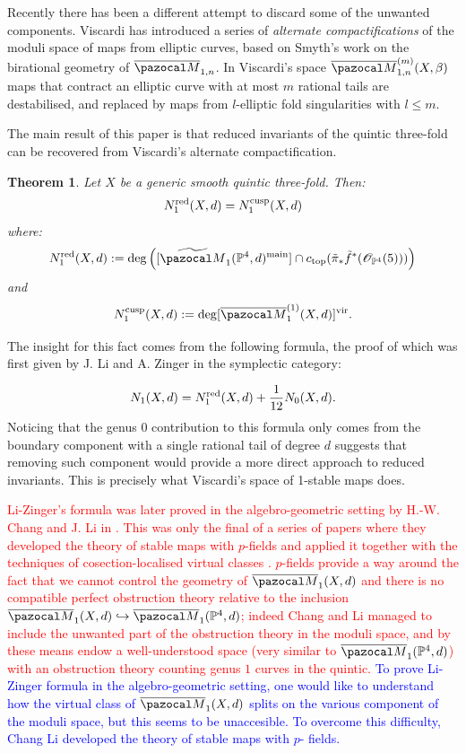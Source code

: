 \documentclass[11pt]{amsart}
\newcommand{\Mone}[3]{\overline{\pazocal M}^{(1)}_{#1}(#2,#3)}
\newcommand{\PP}{\mathbb P}
\newcommand{\oM}{\overline{\pazocal M}}
\theoremstyle{plain}
\newtheorem{thm}{Theorem}[section]
\theoremstyle{definition}
\begin{document}
Recently there has been a different attempt to discard some of the unwanted components. Viscardi \cite{VISC} has introduced a series of \emph{alternate compactifications} of the moduli space of maps from elliptic curves, based on Smyth's work on the birational geometry of $\oM_{1,n}$. In Viscardi's space $\oM_{1,n}^{(m)}(X,\beta)$ maps that contract an elliptic curve with at most $m$ rational tails are destabilised, and replaced by maps from $l$-elliptic fold singularities with $l\leq m$.

The main result of this paper is that reduced invariants of the quintic three-fold can be recovered from Viscardi's alternate compactification.

\begin{thm}
Let $X$ be a generic smooth quintic three-fold. Then:
\[
N_1^{\rm{red}}(X,d)=N_1^{\rm{cusp}}(X,d)
\]
where:
\[N_1^{\rm{red}}(X,d):=\deg \left([\widetilde{\pazocal M}_{1}(\PP^4,d)^{\rm{main}}]\cap c_{\rm{top}}(\tilde\pi_*\tilde f^*(\mathcal O_{\PP^4}(5)))\right)\]
and
\[N_1^{\rm{cusp}}(X,d):=\deg [\Mone{1}{X}{d}]^{\rm{vir}}.
\]
\end{thm}

The insight for this fact comes from the following formula, the proof of which was first given by J. Li and A. Zinger \cite{LZ} in the symplectic category:

$$N_1(X,d)=N_1^{\rm{red}}(X,d)+\frac{1}{12}N_0(X,d).$$
Noticing that the genus $0$ contribution to this formula only comes from the boundary component with a single rational tail of degree $d$ suggests that removing such component would provide a more direct approach to reduced invariants. This is precisely what Viscardi's space of 1-stable maps does.

\textcolor{red}{Li-Zinger's formula was later proved in the algebro-geometric setting by H.-W. Chang and J. Li in \cite{CL}. This was only the final of a series of papers where they developed the theory of stable maps with $p$-fields and applied it together with the techniques of cosection-localised virtual classes \cite{KLcosection}. $p$-fields provide a way around the fact that we cannot control the geometry of $\oM_1(X,d)$ and there is no compatible perfect obstruction theory relative to the inclusion $\oM_1(X,d)\hookrightarrow \oM_1(\PP^4,d)$; indeed Chang and Li managed to include the unwanted part of the obstruction theory in the moduli space, and by these means endow a well-understood space (very similar to $\oM_1(\PP^4,d)$) with an obstruction theory counting genus $1$ curves in the quintic.}
\textcolor{blue}{To prove Li-Zinger formula in the algebro-geometric setting, one would like to understand how the virtual class of  $\oM_1(X,d)$ splits on the various component of the moduli space, but this seems to be unaccesible. To overcome this difficulty, Chang Li developed the theory of stable maps with $p$- fields.}
\end{document}

